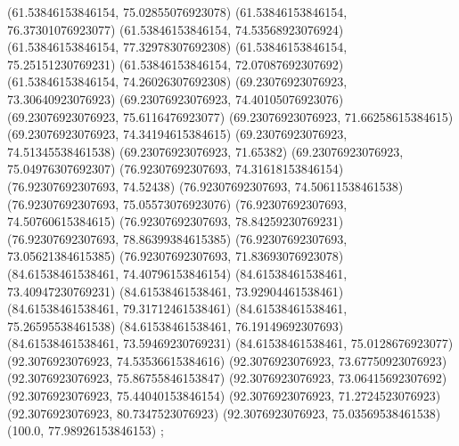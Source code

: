 {{{		(61.53846153846154, 75.02855076923078)
		(61.53846153846154, 76.37301076923077)
		(61.53846153846154, 74.53568923076924)
		(61.53846153846154, 77.32978307692308)
		(61.53846153846154, 75.25151230769231)
		(61.53846153846154, 72.07087692307692)
		(61.53846153846154, 74.26026307692308)
		(69.23076923076923, 73.30640923076923)
		(69.23076923076923, 74.40105076923076)
		(69.23076923076923, 75.6116476923077)
		(69.23076923076923, 71.66258615384615)
		(69.23076923076923, 74.34194615384615)
		(69.23076923076923, 74.51345538461538)
		(69.23076923076923, 71.65382)
		(69.23076923076923, 75.04976307692307)
		(76.92307692307693, 74.31618153846154)
		(76.92307692307693, 74.52438)
		(76.92307692307693, 74.50611538461538)
		(76.92307692307693, 75.05573076923076)
		(76.92307692307693, 74.50760615384615)
		(76.92307692307693, 78.84259230769231)
		(76.92307692307693, 78.86399384615385)
		(76.92307692307693, 73.05621384615385)
		(76.92307692307693, 71.83693076923078)
		(84.61538461538461, 74.40796153846154)
		(84.61538461538461, 73.40947230769231)
		(84.61538461538461, 73.92904461538461)
		(84.61538461538461, 79.31712461538461)
		(84.61538461538461, 75.26595538461538)
		(84.61538461538461, 76.19149692307693)
		(84.61538461538461, 73.59469230769231)
		(84.61538461538461, 75.0128676923077)
		(92.3076923076923, 74.53536615384616)
		(92.3076923076923, 73.67750923076923)
		(92.3076923076923, 75.86755846153847)
		(92.3076923076923, 73.06415692307692)
		(92.3076923076923, 75.44040153846154)
		(92.3076923076923, 71.2724523076923)
		(92.3076923076923, 80.7347523076923)
		(92.3076923076923, 75.03569538461538)
		(100.0, 77.98926153846153)
	};

}}
